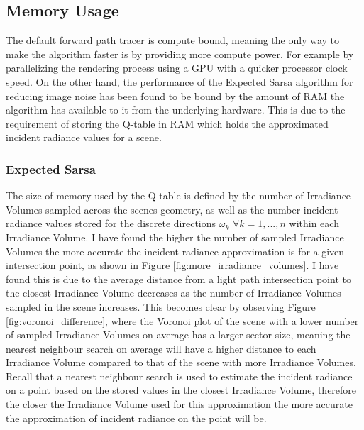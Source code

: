 \documentclass[../dissertation.tex]{subfiles}
\begin{document}
\subsection{Memory Usage}

The default forward path tracer is compute bound, meaning the only way to make the algorithm faster is by providing more compute power. For example by parallelizing the rendering process using a GPU with a quicker processor clock speed. On the other hand, the performance of the Expected Sarsa algorithm for reducing image noise has been found to be bound by the amount of RAM the algorithm has available to it from the  underlying hardware. This is due to the requirement of storing the Q-table in RAM which holds the approximated incident radiance values for a scene.\\

\subsubsection{Expected Sarsa}

The size of memory used by the Q-table is defined by the number of Irradiance Volumes sampled across the scenes geometry, as well as the number incident radiance values stored for the discrete directions $\omega_k$ $\forall k = 1,...,n$  within each Irradiance Volume. I have found the higher the number of sampled Irradiance Volumes the more accurate the incident radiance approximation is for a given intersection point, as shown in Figure \ref{fig:more_irradiance_volumes}.  I have found this is due to the average distance from a light path intersection point to the closest Irradiance Volume decreases as the number of Irradiance Volumes sampled in the scene increases. This becomes clear by observing Figure \ref{fig:voronoi_difference}, where the Voronoi plot of the scene with a lower number of sampled Irradiance Volumes on average has a larger sector size, meaning the nearest neighbour search on average will have a higher distance to each Irradiance Volume compared to that of the scene with more Irradiance Volumes. Recall that a nearest neighbour search is used to estimate the incident radiance on a point based on the stored values in the closest Irradiance Volume, therefore the closer the Irradiance Volume used for this approximation the more accurate the approximation of incident radiance on the point will be.\\

\end{document}
